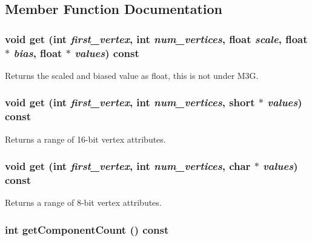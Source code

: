 \subsection{Member Function Documentation}
\hypertarget{classm3g_1_1VertexArray_1adedf59e0c6a047242a3914ca52b929}{
\subsubsection[{get}]{\setlength{\rightskip}{0pt plus 5cm}void get (int {\em first\_\-vertex}, \/  int {\em num\_\-vertices}, \/  float {\em scale}, \/  float $\ast$ {\em bias}, \/  float $\ast$ {\em values}) const}}
\label{classm3g_1_1VertexArray_1adedf59e0c6a047242a3914ca52b929}


Returns the scaled and biased value as float, this is not under M3G. \hypertarget{classm3g_1_1VertexArray_575822f60d7b5e74ed51e94851123038}{
\subsubsection[{get}]{\setlength{\rightskip}{0pt plus 5cm}void get (int {\em first\_\-vertex}, \/  int {\em num\_\-vertices}, \/  short $\ast$ {\em values}) const}}
\label{classm3g_1_1VertexArray_575822f60d7b5e74ed51e94851123038}


Returns a range of 16-bit vertex attributes. \hypertarget{classm3g_1_1VertexArray_9d1b801a7c196a07553a5ef4a5473573}{
\subsubsection[{get}]{\setlength{\rightskip}{0pt plus 5cm}void get (int {\em first\_\-vertex}, \/  int {\em num\_\-vertices}, \/  char $\ast$ {\em values}) const}}
\label{classm3g_1_1VertexArray_9d1b801a7c196a07553a5ef4a5473573}


Returns a range of 8-bit vertex attributes. \hypertarget{classm3g_1_1VertexArray_7016f51d2788e78fdd736efd040f5e5e}{
\subsubsection[{getComponentCount}]{\setlength{\rightskip}{0pt plus 5cm}int getComponentCount () const}}
\label{classm3g_1_1VertexArray_7016f51d2788e78fdd736efd040f5e5e}


